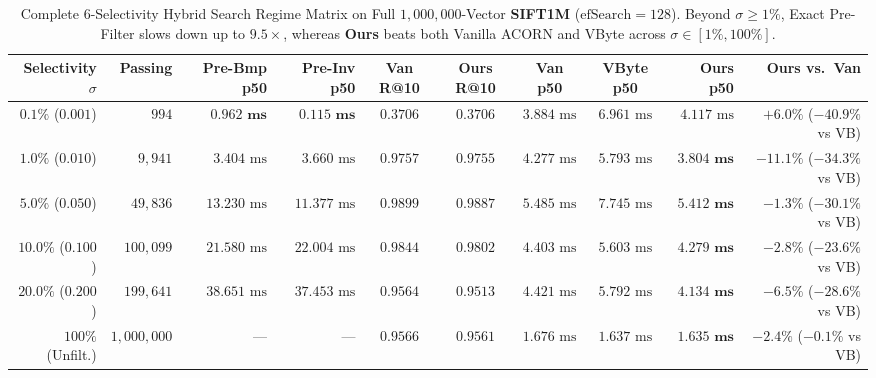 \begin{table}[t]
\centering
\caption{Complete 6-Selectivity Hybrid Search Regime Matrix on Full $1{,}000{,}000$-Vector \textbf{SIFT1M} ($\text{efSearch}=128$). Beyond $\sigma \ge 1\%$, Exact Pre-Filter slows down up to $9.5\times$, whereas \textbf{Ours} beats both Vanilla ACORN and VByte across $\sigma \in [1\%, 100\%]$.}
\label{tab:selectivity}
\small
\begin{tabular}{@{}rrrrccccrr@{}}
\toprule
\textbf{Selectivity $\sigma$} & \textbf{Passing} & \textbf{Pre-Bmp p50} & \textbf{Pre-Inv p50} & \textbf{Van R@10} & \textbf{Ours R@10} & \textbf{Van p50} & \textbf{VByte p50} & \textbf{Ours p50} & \textbf{Ours vs.\ Van} \\
\midrule
$0.1\%$ ($0.001$) & $994$ & $\mathbf{0.962\text{ ms}}$ & $\mathbf{0.115\text{ ms}}$ & $0.3706$ & $0.3706$ & $3.884\text{ ms}$ & $6.961\text{ ms}$ & $4.117\text{ ms}$ & $+6.0\%$ ($-40.9\%$ vs VB) \\
$1.0\%$ ($0.010$) & $9{,}941$ & $3.404\text{ ms}$ & $3.660\text{ ms}$ & $0.9757$ & $\mathbf{0.9755}$ & $4.277\text{ ms}$ & $5.793\text{ ms}$ & $\mathbf{3.804\text{ ms}}$ & $\mathbf{-11.1\%}$ ($-34.3\%$ vs VB) \\
$5.0\%$ ($0.050$) & $49{,}836$ & $13.230\text{ ms}$ & $11.377\text{ ms}$ & $0.9899$ & $\mathbf{0.9887}$ & $5.485\text{ ms}$ & $7.745\text{ ms}$ & $\mathbf{5.412\text{ ms}}$ & $\mathbf{-1.3\%}$ ($-30.1\%$ vs VB) \\
$10.0\%$ ($0.100$) & $100{,}099$ & $21.580\text{ ms}$ & $22.004\text{ ms}$ & $0.9844$ & $\mathbf{0.9802}$ & $4.403\text{ ms}$ & $5.603\text{ ms}$ & $\mathbf{4.279\text{ ms}}$ & $\mathbf{-2.8\%}$ ($-23.6\%$ vs VB) \\
$20.0\%$ ($0.200$) & $199{,}641$ & $38.651\text{ ms}$ & $37.453\text{ ms}$ & $0.9564$ & $\mathbf{0.9513}$ & $4.421\text{ ms}$ & $5.792\text{ ms}$ & $\mathbf{4.134\text{ ms}}$ & $\mathbf{-6.5\%}$ ($-28.6\%$ vs VB) \\
$100\%$ (Unfilt.) & $1{,}000{,}000$ & --- & --- & $0.9566$ & $\mathbf{0.9561}$ & $1.676\text{ ms}$ & $1.637\text{ ms}$ & $\mathbf{1.635\text{ ms}}$ & $\mathbf{-2.4\%}$ ($-0.1\%$ vs VB) \\
\bottomrule
\end{tabular}
\end{table}

